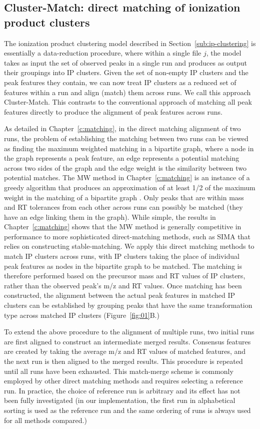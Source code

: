 \subsection{Cluster-Match: direct matching of ionization product clusters\label{sub:cluster-match}}

The ionization product clustering model described in Section~\ref{sub:ip-clustering} is essentially a data-reduction procedure, where within a single file $j$, the model takes as input the set of observed peaks in a single run and produces as output their groupings into IP clusters. Given the set of non-empty IP clusters and the peak features they contain, we can now treat IP clusters as a reduced set of features within a run and align (match) them across runs. We call this approach Cluster-Match. This contrasts to the conventional approach of matching all peak features directly to produce the alignment of peak features across runs. 

As detailed in Chapter~\ref{c:matching}, in the direct matching alignment of two runs, the problem of establishing the matching between two runs can be viewed as finding the maximum weighted matching in a bipartite graph, where a node in the graph represents a peak feature, an edge represents a potential matching across two sides of the graph and the edge weight is the similarity between two potential matches. The MW method  in Chapter~\ref{c:matching} is an instance of a greedy algorithm that produces an approximation of at least 1/2 of the maximum weight in the matching of a bipartite graph \cite{Maximum2011}. Only peaks that are within mass and RT tolerances from each other across runs can possibly be matched (they have an edge linking them in the graph). While simple, the results in Chapter~\ref{c:matching} shows that the MW method is generally competitive in performance to more sophisticated direct-matching methods, such as SIMA that relies on constructing stable-matching. We apply this direct matching methods to match IP clusters across runs, with IP clusters taking the place of individual peak features as nodes in the bipartite graph to be matched. The matching is therefore performed based on the precursor mass and RT values of IP clusters, rather than the observed peak's m/z and RT values. Once matching has been constructed, the alignment between the actual peak features in matched IP clusters can be established by grouping peaks that have the same transformation type across matched IP clusters (Figure~\ref{fig:01}B.)

To extend the above procedure to the alignment of multiple runs, two initial runs are first aligned to construct an intermediate merged results. Consensus features are created by taking the average m/z and RT values of matched features, and the next run is then aligned to the merged results. This procedure is repeated until all runs have been exhausted. This match-merge scheme is commonly employed by other direct matching methods \cite{Voss2011a, Pluskal2010} and requires selecting a reference run. In practice, the choice of reference run is arbitrary and its effect has not been fully investigated (in our implementation, the first run in alphabetical sorting is used as the reference run and the same ordering of runs is always used for all methods compared.)


